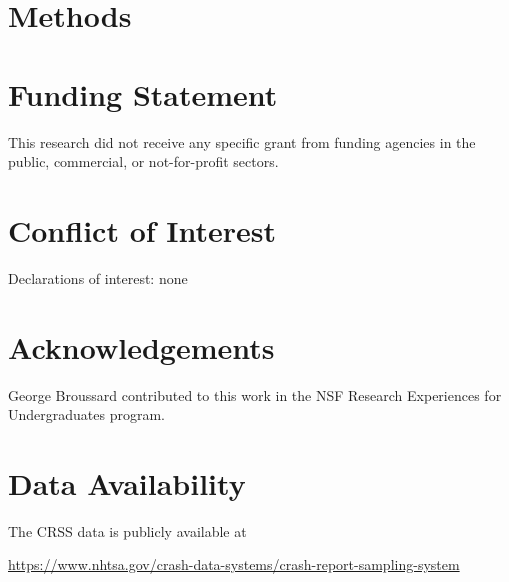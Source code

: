 \documentclass[fleqn]{cas-sc}
\begin{document}
%
%
%






\section{Methods}\label{sec:Methods}

%

\FloatBarrier














\section*{Funding Statement}

This research did not receive any specific grant from funding agencies in the public, commercial, or not-for-profit sectors.

\section*{Conflict of Interest}

Declarations of interest: none

\section*{Acknowledgements}

George Broussard 
contributed to this work in the 
NSF Research Experiences for Undergraduates program.

\section*{Data Availability}

The CRSS data is publicly available at 

\url{https://www.nhtsa.gov/crash-data-systems/crash-report-sampling-system}
\end{document}
